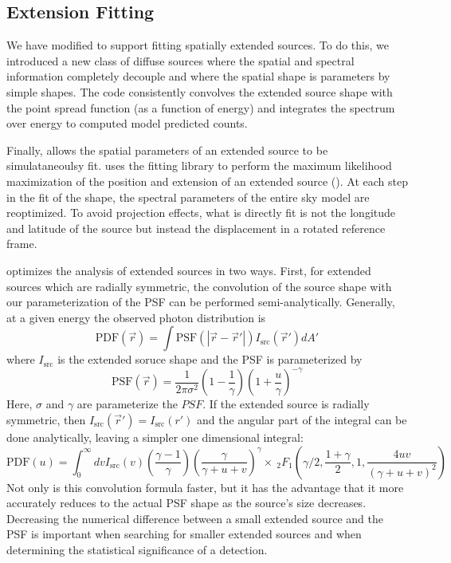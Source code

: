 \documentclass[preprint]{aastex}
\newcommand{\pointlike}{\text{\em pointlike}\xspace}
\newcommand{\minuit}{\text{\em Minuit}\xspace}
\begin{document}
\subsection{Extension Fitting}
\label{extension_fitting}

We have modified \pointlike to support fitting spatially extended
sources.  To do this, we introduced a new class of diffuse sources where
the spatial and spectral information completely decouple and where
the spatial shape is parameters by simple shapes.
The code consistently convolves the extended source shape with the point
spread function (as a function of energy) and integrates the spectrum over energy
to computed model predicted counts.

Finally, \pointlike allows the spatial parameters of an extended
source to be simulataneoulsy fit. \pointlike uses the \minuit fitting
library to perform the maximum likelihood maximization of the position
and extension of an extended source (\cite{minuit_documentation}).  At each
step in the fit of the shape, the spectral parameters of the entire sky
model are reoptimized. To avoid projection effects, what is directly
fit is not the longitude and latitude of the source but instead
the displacement in a rotated reference frame. 


\pointlike optimizes the analysis of extended sources in two ways.
First, for extended sources which are radially symmetric, the convolution
of the source shape with our parameterization of the PSF can be performed
semi-analytically. Generally, at a given energy the observed 
photon distribution is
\begin{equation}
  \text{PDF}(\vec r) = \int  \text{PSF}(|\vec r - \vec r'|)I_\text{src}(\vec r') d A' 
\end{equation}
where $I_\text{src}$ is the extended soruce shape and the PSF is parameterized by
\begin{equation}
  \text{PSF}(\vec r) = 
  \frac{1}{2\pi\sigma^2}
  \left(1-\frac{1}{\gamma}\right)
  \left(1+\frac{u}{\gamma}\right)^{-\gamma}
\end{equation}
Here, $\sigma$ and $\gamma$ are parameterize the $PSF$.
If the extended source is radially symmetric, then
$I_\text{src} (\vec r') = I_\text{src} (r')$ and the angular part of the
integral can be done analytically, leaving a simpler one dimensional
integral:
\begin{equation}
  \text{PDF}(u)= \int_0^\infty dv
  I_\text{src}(v) 
  \left(\frac{\gamma-1}{\gamma}\right)
  \left( \frac{\gamma}{\gamma + u + v}\right)^\gamma 
  \times ~_2F_1 \left(\gamma/2,\frac{1+\gamma}{2},1,\frac{4uv}{(\gamma+u+v)^2}\right)
\end{equation}
Not only is this convolution formula faster, but it has the advantage
that it more accurately reduces to the actual PSF shape as the source's
size decreases.  Decreasing the numerical difference between a small extended
source and the PSF is important when searching for smaller extended sources
and when determining the statistical significance of a detection.
\end{document}

